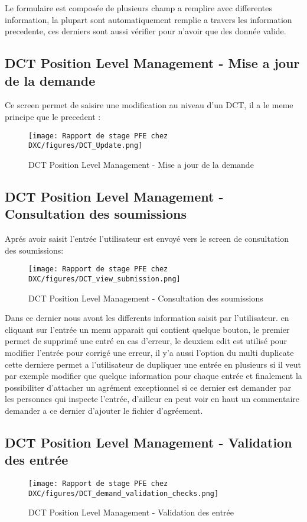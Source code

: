 Le formulaire est composée de plusieurs champ a remplire avec differentes information, la plupart sont automatiquement remplie a travers les information precedente, ces derniers sont aussi vérifier pour n'avoir que des donnée valide.

\subsection{DCT Position Level Management - Mise a jour de la demande}

Ce screen permet de saisire une modification au niveau d'un DCT, il a le meme principe que le precedent : 

\begin{figure}[H]
    \centering
    \texttt{[image: Rapport de stage PFE chez DXC/figures/DCT\_Update.png]}
    \caption{DCT Position Level Management - Mise a jour de la demande}
\end{figure}

\subsection{DCT Position Level Management - Consultation des soumissions}

Aprés avoir saisit l'entrée l'utilisateur est envoyé vers le screen de consultation des soumissions:


\begin{figure}[H]
    \centering
    \texttt{[image: Rapport de stage PFE chez DXC/figures/DCT\_view\_submission.png]}
    \caption{DCT Position Level Management - Consultation des soumissions}
\end{figure}

Dans ce dernier nous avont les differents information saisit par l'utilisateur. en cliquant sur l'entrée un menu apparait qui contient quelque bouton, le premier permet de supprimé une entré en cas d'erreur, le deuxiem edit est utilisé pour modifier l'entrée pour corrigé une erreur, il y'a aussi l'option du multi duplicate cette derniere permet a l'utilisateur de dupliquer une entrée en plusieurs si il veut par exemple modifier que quelque information pour chaque entrée et finalement la possibiliter d'attacher un agrément exceptionnel si ce dernier est demander par les personnes qui inspecte l'entrée, d'ailleur en peut voir en haut un commentaire demander a ce dernier d'ajouter le fichier d'agréement.

\subsection{DCT Position Level Management - Validation des entrée}

\begin{figure}[H]
    \centering
    \texttt{[image: Rapport de stage PFE chez DXC/figures/DCT\_demand\_validation\_checks.png]}
    \caption{DCT Position Level Management - Validation des entrée}
\end{figure}